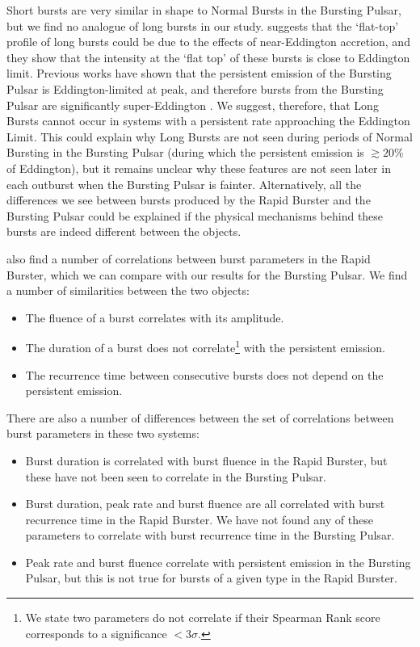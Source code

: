 \par Short bursts are very similar in shape to Normal Bursts in the Bursting Pulsar, but we find no analogue of long bursts in our study.  \citet{Bagnoli_PopStudy} suggests that the `flat-top' profile of long bursts could be due to the effects of near-Eddington accretion, and they show that the intensity at the `flat top' of these bursts is close to Eddington limit.  Previous works have shown that the persistent emission of the Bursting Pulsar is Eddington-limited at peak, and therefore bursts from the Bursting Pulsar are significantly super-Eddington \citep{Sazonov_BPGranat}.   We suggest, therefore, that Long Bursts cannot occur in systems with a persistent rate approaching the Eddington Limit.  This could explain why Long Bursts are not seen during periods of Normal Bursting in the Bursting Pulsar (during which the persistent emission is $\gtrsim{20}$\% of Eddington), but it remains unclear why these features are not seen later in each outburst when the Bursting Pulsar is fainter.  Alternatively, all the differences we see between bursts produced by the Rapid Burster and the Bursting Pulsar could be explained if the physical mechanisms behind these bursts are indeed different between the objects.
\par \citet{Bagnoli_PopStudy} also find a number of correlations between burst parameters in the Rapid Burster, which we can compare with our results for the Bursting Pulsar.  We find a number of similarities between the two objects:

\begin{itemize}
\item The fluence of a burst correlates with its amplitude.
\item The duration of a burst does not correlate\footnote{We state two parameters do not correlate if their Spearman Rank score corresponds to a significance $<3\sigma$.} with the persistent emission.
\item The recurrence time between consecutive bursts does not depend on the persistent emission.
 \end{itemize}

\par There are also a number of differences between the set of correlations between burst parameters in these two systems:

\begin{itemize}
\item Burst duration is correlated with burst fluence in the Rapid Burster, but these have not been seen to correlate in the Bursting Pulsar.
\item Burst duration, peak rate and burst fluence are all correlated with burst recurrence time in the Rapid Burster.  We have not found any of these parameters to correlate with burst recurrence time in the Bursting Pulsar.
\item Peak rate and burst fluence correlate with persistent emission in the Bursting Pulsar, but this is not true for bursts of a given type in the Rapid Burster.
\end{itemize}

